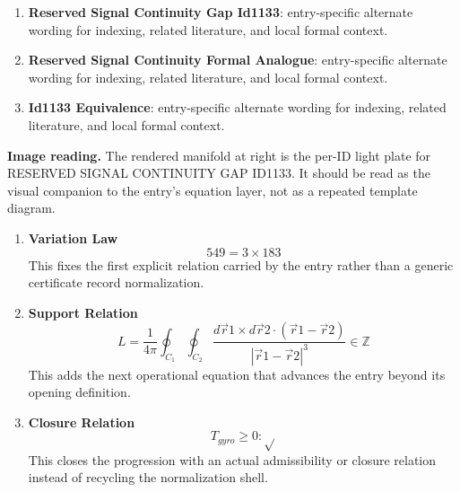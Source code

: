 \begin{enumerate}[leftmargin=1.6em,itemsep=6pt,topsep=4pt]
\item \textbf{Reserved Signal Continuity Gap Id1133}: entry-specific alternate wording for indexing, related literature, and local formal context.
\item \textbf{Reserved Signal Continuity Formal Analogue}: entry-specific alternate wording for indexing, related literature, and local formal context.
\item \textbf{Id1133 Equivalence}: entry-specific alternate wording for indexing, related literature, and local formal context.
\end{enumerate}

\begin{samepage}
\noindent\begin{minipage}[t]{0.45\linewidth}
\vspace{0pt}
\raggedright
\scriptsize\textbf{Image reading.} The rendered manifold at right is the per-ID light plate for RESERVED SIGNAL CONTINUITY GAP ID1133. It should be read as the visual companion to the entry's equation layer, not as a repeated template diagram.\par
\end{minipage}\hfill
\begin{minipage}[t]{0.53\linewidth}
\vspace*{-0.10in}
\raggedright
{}
\end{minipage}
\end{samepage}

\clearpage


\begin{enumerate}[leftmargin=1.6em,itemsep=9pt,topsep=6pt]
\item \textbf{Variation Law}
\[
549=3\times183
\]
This fixes the first explicit relation carried by the entry rather than a generic certificate record normalization.

\item \textbf{Support Relation}
\[
L = \frac{1}{4\pi}\oint_{C_{1}}\oint_{C_{2}}\frac{d\vec{r} {1}\times d\vec{r} {2}\cdot(\vec{r} {1}-\vec{r} {2})}{|\vec{r} {1}-\vec{r} {2}|^{3}} \in \mathbb{Z}
\]
This adds the next operational equation that advances the entry beyond its opening definition.

\item \textbf{Closure Relation}
\[
T_{gyro}\ge0:\sqrt{}
\]
This closes the progression with an actual admissibility or closure relation instead of recycling the normalization shell.
\end{enumerate}

